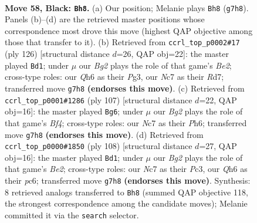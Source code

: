 \documentclass[11pt]{article}
\begin{document}
\clearpage

\begin{figure}[p]\centering
\begin{subfigure}{0.46\textwidth}\centering
\resizebox{\linewidth}{!}{%
\newchessgame
\chessboard[
  setfen={5k2/2n2pb1/7q/3P4/6R1/8/5K2/8 b - - 3 58},
  showmover=false,
  pgfstyle=straightmove, color=movearrow, markmove={g7-h8}
]}
\caption{}
\end{subfigure}\hfill
\begin{subfigure}{0.46\textwidth}\centering
\resizebox{\linewidth}{!}{%
\newchessgame
\chessboard[
  setfen={8/3R1b2/5k1p/8/8/5KP1/2r1B3/8 w - - 15 64},
  showmover=false,
  pgfstyle=straightmove, color=movearrow, markmove={e2-d1}
]}
\caption{}
\end{subfigure}
\\[4pt]
\begin{subfigure}{0.46\textwidth}\centering
\resizebox{\linewidth}{!}{%
\newchessgame
\chessboard[
  setfen={8/6pk/7p/3R1b2/5P2/4Q3/7K/1q6 b - - 10 54},
  showmover=false,
  pgfstyle=straightmove, color=movearrow, markmove={f5-g6}
]}
\caption{}
\end{subfigure}\hfill
\begin{subfigure}{0.46\textwidth}\centering
\resizebox{\linewidth}{!}{%
\newchessgame
\chessboard[
  setfen={8/1Pk5/2p5/8/8/2PK4/4B1r1/8 w - - 1 55},
  showmover=false,
  pgfstyle=straightmove, color=movearrow, markmove={e2-d1}
]}
\caption{}
\end{subfigure}
\caption{\textbf{Move 58, Black: \texttt{Bh8}.} (a) Our position; Melanie plays \texttt{Bh8} (\texttt{g7h8}). Panels (b)--(d) are the retrieved master positions whose correspondence most drove this move (highest QAP objective among those that transfer to it). (b) Retrieved from \texttt{ccrl\_top\_p0002\#17} (ply 126) [structural distance $d$=26, QAP obj=22]: the master played \texttt{Bd1}; under $\mu$ our \emph{Bg2} plays the role of that game's \emph{Be2}; cross-type roles: our \emph{Q}h6 as their \emph{P}g3, our \emph{N}c7 as their \emph{R}d7; transferred move \texttt{g7h8} \textbf{(endorses this move)}. (c) Retrieved from \texttt{ccrl\_top\_p0001\#1286} (ply 107) [structural distance $d$=22, QAP obj=16]: the master played \texttt{Bg6}; under $\mu$ our \emph{Bg2} plays the role of that game's \emph{Bf4}; cross-type roles: our \emph{N}c7 as their \emph{P}h6; transferred move \texttt{g7h8} \textbf{(endorses this move)}. (d) Retrieved from \texttt{ccrl\_top\_p0000\#1850} (ply 108) [structural distance $d$=27, QAP obj=16]: the master played \texttt{Bd1}; under $\mu$ our \emph{Bg2} plays the role of that game's \emph{Be2}; cross-type roles: our \emph{N}c7 as their \emph{P}c3, our \emph{Q}h6 as their \emph{p}c6; transferred move \texttt{g7h8} \textbf{(endorses this move)}. Synthesis: 8 retrieved analogs transferred to \texttt{Bh8} (summed QAP objective 118, the strongest correspondence among the candidate moves); Melanie committed it via the \texttt{search} selector.}
\label{fig:thought-m115}
\end{figure}
\end{document}
